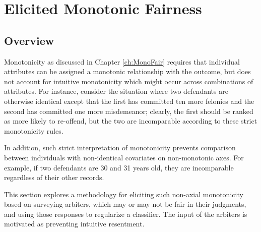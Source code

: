 \chapter{Elicited Monotonic Fairness}
\label{ch:SoftMonoFair}

\section{Overview}

    Monotonicity as discussed in Chapter \ref{ch:MonoFair} requires that individual attributes can be assigned a monotonic relationship with the outcome, but does not account for intuitive monotonicity which might occur across combinations of attributes.  For instance, consider the situation where two defendants are otherwise identical except that the first has committed ten more felonies and the second has committed one more misdemeanor; clearly, the first should be ranked as more likely to re-offend, but the two are incomparable according to these strict monotonicity rules.  
    
    In addition, such strict interpretation of monotonicity prevents comparison between individuals with non-identical covariates on non-monotonic axes.  For example, if two defendants are 30 and 31 years old, they are incomparable regardless of their other records.
    
    This section explores a methodology for eliciting such non-axial monotonicity based on surveying arbiters, which may or may not be fair in their judgments, and using those responses to regularize a classifier.  The input of the arbiters is motivated as preventing intuitive resentment. 

    
    
    

